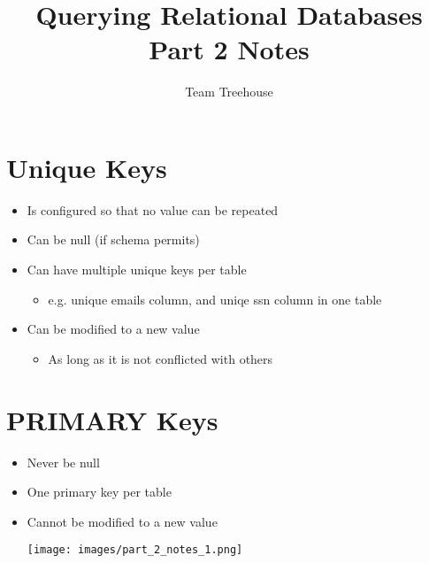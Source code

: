 \documentclass[12pt]{article}
\begin{document}
\title{Querying Relational Databases Part 2 Notes}
\author{Team Treehouse}
\maketitle

\bigskip

\section{Unique Keys}

\bigskip

\begin{itemize}
    \item Is configured so that no value can be repeated
    \item Can be null (if schema permits)
    \item Can have multiple unique keys per table
    \begin{itemize}
        \item e.g. unique emails column, and uniqe ssn column in one table
    \end{itemize}
    \item Can be modified to a new value
    \begin{itemize}
        \item As long as it is not conflicted with others
    \end{itemize}
\end{itemize}

\bigskip

\section{PRIMARY Keys}

\bigskip

\begin{itemize}
    \item Never be null
    \item One primary key per table
    \item Cannot be modified to a new value

    \begin{center}
    \texttt{[image: images/part\_2\_notes\_1.png]}
    \end{center}
\end{itemize}
\end{document}
